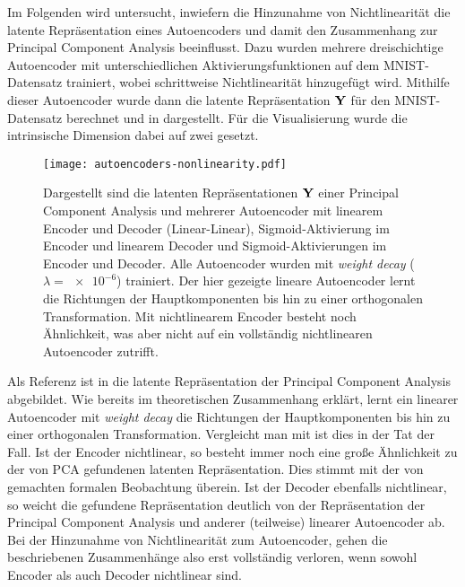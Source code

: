 Im Folgenden wird untersucht, inwiefern die Hinzunahme von Nichtlinearität die latente
Repräsentation eines Autoencoders und damit den Zusammenhang zur Principal Component Analysis
beeinflusst. Dazu wurden mehrere dreischichtige Autoencoder mit unterschiedlichen
Aktivierungsfunktionen auf dem MNIST-Datensatz trainiert, wobei schrittweise Nichtlinearität
hinzugefügt wird. Mithilfe dieser Autoencoder wurde dann die latente Repräsentation $\mathbf{Y}$ für
den MNIST-Datensatz berechnet und in  dargestellt. Für die
Visualisierung wurde die intrinsische Dimension dabei auf zwei gesetzt.
\begin{figure}[ht]
	\centering
	\texttt{[image: autoencoders-nonlinearity.pdf]}
	\caption[Latente Repräsentationen von PCA und drei Autoencodern mit unterschiedlichen Aktivierungsfunktionen]{Dargestellt sind die latenten Repräsentationen $\mathbf{Y}$ einer \captiona Principal Component Analysis und mehrerer Autoencoder mit \captionb linearem Encoder und Decoder (Linear-Linear), \captionc Sigmoid-Aktivierung im Encoder und linearem Decoder und \captiond Sigmoid-Aktivierungen im Encoder und Decoder. Alle Autoencoder wurden mit \textit{weight decay} ($\lambda = \num{e-6}$) trainiert. Der hier gezeigte lineare Autoencoder lernt die Richtungen der Hauptkomponenten bis hin zu einer orthogonalen Transformation. Mit nichtlinearem Encoder besteht noch Ähnlichkeit, was aber nicht auf ein vollständig nichtlinearen Autoencoder zutrifft.}
	\label{fig:Autoencoder-Nichtlinearitaet}
\end{figure}
Als Referenz ist in \captiona die latente Repräsentation der Principal Component Analysis abgebildet. Wie bereits im theoretischen Zusammenhang erklärt, lernt ein linearer Autoencoder mit \textit{weight decay} die Richtungen der Hauptkomponenten bis hin zu einer orthogonalen Transformation. Vergleicht man  \captiona mit \captionb ist dies in der Tat der Fall. Ist der Encoder nichtlinear, so besteht immer noch eine große Ähnlichkeit zu der von PCA gefundenen latenten Repräsentation. Dies stimmt mit der von \textcite{Bourlard.1988} gemachten formalen Beobachtung überein. Ist der Decoder ebenfalls nichtlinear, so weicht die gefundene Repräsentation deutlich von der Repräsentation der Principal Component Analysis und anderer (teilweise) linearer Autoencoder ab. Bei der Hinzunahme von Nichtlinearität zum Autoencoder, gehen die beschriebenen Zusammenhänge also erst vollständig verloren, wenn sowohl Encoder als auch Decoder nichtlinear sind.

